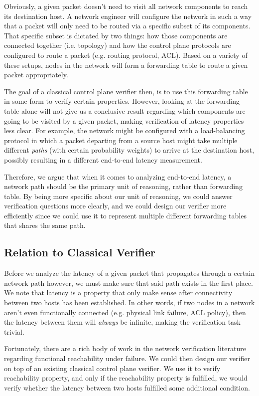\documentclass[10pt,sigconf,letterpaper,anonymous,nonacm]{acmart}
\begin{document}
Obviously, a given packet doesn't need to visit all network components to reach its destination 
host.
A network engineer will configure the network in such a way that a packet will only need to be 
routed via a specific subset of its components.
That specific subset is dictated by two things: how those components are connected together 
(i.e. topology) and how the control plane protocols are configured to route a packet (e.g. routing 
protocol, ACL).
Based on a variety of these setups, nodes in the network will form a forwarding table to route a 
given packet appropriately.

The goal of a classical control plane verifier then, is to use this forwarding table in some 
form to verify certain properties. %
However, looking at the forwarding table alone will not give us a conclusive result regarding 
which components are going to be visited by a given packet, making verification of latency 
properties less clear.
For example, the network might be configured with a load-balancing protocol in which a packet 
departing from a source host might take multiple different \textit{paths} (with certain 
probability weights) to arrive at the destination host, possibly resulting in a different 
end-to-end latency measurement.

Therefore, we argue that when it comes to analyzing end-to-end latency, a network path should be 
the primary unit of reasoning, rather than forwarding table.
By being more specific about our unit of reasoning, we could answer verification questions more 
clearly, and we could design our verifier more efficiently since we could use it to represent 
multiple different forwarding tables that shares the same path.

\subsection{Relation to Classical Verifier}
Before we analyze the latency of a given packet that propagates through a certain network 
path however, we must make sure that said path exists in the first place.
We note that latency is a property that only make sense after connectivity between two hosts 
has been established. 
In other words, if two nodes in a network aren't even functionally connected (e.g. physical 
link failure, ACL policy), then the latency between them will \textit{always} be infinite, 
making the verification task trivial.

Fortunately, there are a rich body of work in the network verification literature regarding 
functional reachability under failure. %
We could then design our verifier on top of an existing classical control plane verifier.
We use it to verify reachability property, and only if the reachability property is fulfilled, 
we would verify whether the latency between two hosts fulfilled some additional condition.
\end{document}

